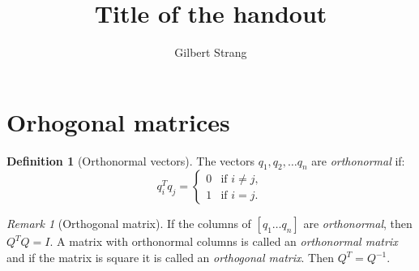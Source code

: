 \documentclass{tufte-handout}
\author{Gilbert Strang}
\title{Title of the handout}
\theoremstyle{definition} \newtheorem{definition}{Definition}
\theoremstyle{remark} \newtheorem{remark}{Remark}
\begin{document}
\maketitle

\section{Orhogonal matrices}
\begin{definition}[Orthonormal vectors]
  The vectors $q_1, q_2, \ldots q_n$ are \emph{orthonormal} if:
  \begin{equation*}
    q_i^Tq_j =
    \begin{cases}
      0 & \text{if } i \ne j,\\
      1 & \text{if } i = j.
    \end{cases}
  \end{equation*}
\end{definition}

\begin{remark}[Orthogonal matrix]
  If the columns of $[q_1  \ldots q_n]$ are \emph{orthonormal},
  then $Q^TQ = I$. A matrix with orthonormal columns is called
  an \emph{orthonormal matrix} and if the matrix is square it is called an
  \emph{orthogonal matrix}. Then $Q^T = Q^{-1}$.
\end{remark}
\end{document}
